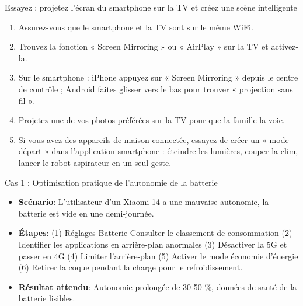 \begin{tcbpractice}{Essayez : projetez l'écran du smartphone sur la TV et créez une scène intelligente}
\begin{enumerate}
  \item Assurez-vous que le smartphone et la TV sont sur le même WiFi.
  \item Trouvez la fonction « Screen Mirroring » ou « AirPlay » sur la TV et activez-la.
  \item Sur le smartphone : iPhone appuyez sur « Screen Mirroring » depuis le centre de contrôle ; Android faites glisser vers le bas pour trouver « projection sans fil ».
  \item Projetez une de vos photos préférées sur la TV pour que la famille la voie.
  \item Si vous avez des appareils de maison connectée, essayez de créer un « mode départ » dans l'application smartphone : éteindre les lumières, couper la clim, lancer le robot aspirateur en un seul geste.
\end{enumerate}

\end{tcbpractice}

\begin{tcbinfo}{Cas 1 : Optimisation pratique de l'autonomie de la batterie}
\begin{itemize}
  \item \textbf{Scénario}: L'utilisateur d'un Xiaomi 14 a une mauvaise autonomie, la batterie est vide en une demi-journée.
  \item \textbf{Étapes}: (1) Réglages Batterie Consulter le classement de consommation (2) Identifier les applications en arrière-plan anormales (3) Désactiver la 5G et passer en 4G (4) Limiter l'arrière-plan (5) Activer le mode économie d'énergie (6) Retirer la coque pendant la charge pour le refroidissement.
  \item \textbf{Résultat attendu}: Autonomie prolongée de 30-50 \%, données de santé de la batterie lisibles.
\end{itemize}

\end{tcbinfo}
